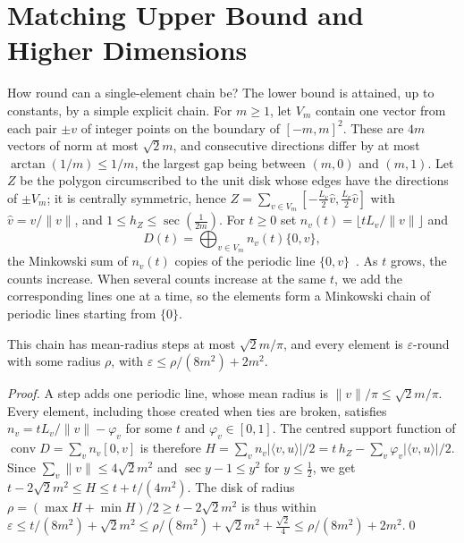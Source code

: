 \documentclass[runningheads]{llncs}
\newcommand{\conv}{\operatorname{conv}}
\begin{document}
\section{Matching Upper Bound and Higher Dimensions}\label{sec:upper}
How round can a single-element chain be? The lower bound is attained, up to constants, by a simple explicit chain. For $m\ge1$, let $V_m$ contain one vector from each pair $\pm v$ of integer points on the boundary of $[-m,m]^2$. These are $4m$ vectors of norm at most $\sqrt2m$, and consecutive directions differ by at most $\arctan(1/m)\le1/m$, the largest gap being between $(m,0)$ and $(m,1)$. Let $Z$ be the polygon circumscribed to the unit disk whose edges have the directions of $\pm V_m$; it is centrally symmetric, hence $Z=\sum_{v\in V_m}[-\frac{L_v}2\hat v,\frac{L_v}2\hat v]$ with $\hat v=v/\|v\|$, and $1\le h_Z\le\sec(\frac1{2m})$. For $t\ge0$ set $n_v(t)=\lfloor tL_v/\|v\|\rfloor$ and
\[
D(t)=\bigoplus_{v\in V_m}n_v(t)\{0,v\},
\]
the Minkowski sum of $n_v(t)$ copies of the periodic line $\{0,v\}$~\cite{jones1996}. As $t$ grows, the counts increase. When several counts increase at the same $t$, we add the corresponding lines one at a time, so the elements form a Minkowski chain of periodic lines starting from $\{0\}$.

\begin{theorem}\label{thm:upper}
This chain has mean-radius steps at most $\sqrt2m/\pi$, and every element is $\varepsilon$-round with some radius $\rho$, with $\varepsilon\le\rho/(8m^2)+2m^2$.
\end{theorem}
\begin{proof}
A step adds one periodic line, whose mean radius is $\|v\|/\pi\le\sqrt2m/\pi$. Every element, including those created when ties are broken, satisfies $n_v=tL_v/\|v\|-\varphi_v$ for some $t$ and $\varphi_v\in[0,1]$. The centred support function of $\conv D=\sum_vn_v[0,v]$ is therefore $H=\sum_vn_v|\langle v,u\rangle|/2=t\,h_Z-\sum_v\varphi_v|\langle v,u\rangle|/2$. Since $\sum_v\|v\|\le4\sqrt2m^2$ and $\sec y-1\le y^2$ for $y\le\frac12$, we get $t-2\sqrt2m^2\le H\le t+t/(4m^2)$. The disk of radius $\rho=(\max H+\min H)/2\ge t-2\sqrt2m^2$ is thus within $\varepsilon\le t/(8m^2)+\sqrt2m^2\le\rho/(8m^2)+\sqrt2m^2+\frac{\sqrt2}4\le\rho/(8m^2)+2m^2$.\qed
\end{proof}
\end{document}
